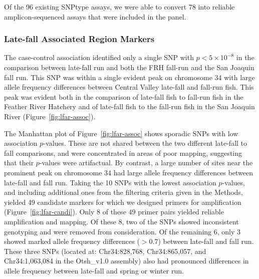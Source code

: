 Of the 96 existing SNPtype assays, we were able to convert 78
into reliable amplicon-sequenced assays that were included in the panel.



\subsubsection*{Late-fall Associated Region Markers}

The case-control association identified only a single SNP with $p < 5\times 10^{-8}$ in the comparison
between late-fall run and both the FRH fall-run and the San Joaquin fall run.  This SNP was within
a single evident peak on chromosome 34 with large allele frequency differences
between Central Valley late-fall and fall-run fish.  This peak was evident both in the comparison of
late-fall fish to fall-run fish in the Feather River Hatchery and of late-fall fish to the fall-run fish in
the San Joaquin River (Figure~\ref{fig:lfar-assoc}).




The Manhattan plot of Figure~\ref{fig:lfar-assoc} shows sporadic SNPs with low association
$p$-values.  These are not shared between the two different late-fall to fall comparisons, and
were concentrated in areas of poor mapping, suggesting that their
$p$-values were artifactual.  By contrast, a large number of sites near the prominent peak on
chromosome 34 had large allele frequency differences between late-fall and fall run.  Taking the
10 SNPs with the lowest association $p$-values, and including additional ones from the filtering criteria given in the
Methods, yielded 49 candidate markers for which we designed primers for amplification (Figure~\ref{fig:lfar-candi}).  Only 8
of these 49 primer pairs yielded reliable amplification and mapping.   Of these 8, two of the SNPs
showed inconsistent genotyping and were removed from consideration.  Of the remaining 6, only 3
showed marked allele frequency differences ($> 0.7$) between late-fall and fall run.  These three
SNPs (located at: Chr34:828,768,  Chr34:865,057, and Chr34:1,063,084 in the Otsh\_v1.0 assembly)
also had pronounced differences in allele frequency between
late-fall and spring or winter run.

